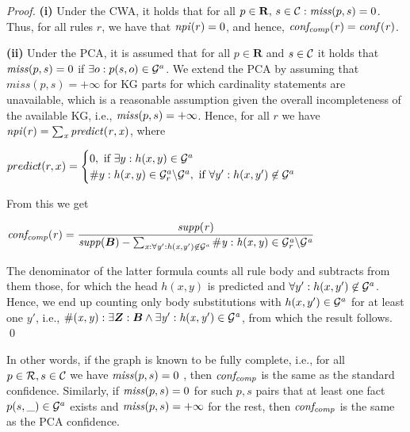\begin{proof}
\textbf{(i)} Under the CWA, it holds that for all $ p\in \mathbf{R},\,s\in \mathcal{C}: \mathit{miss}(p,s) = 0$. Thus, for all rules $r$, we have that $\mathit{npi}(r) = 0$, and hence, $\mathit{conf_{comp}(r)}=\mathit{conf(r)}$.
\smallskip

\noindent \textbf{(ii)} Under the PCA, it is assumed that for all $p\in \mathbf{R}$ and $s \in \mathcal{C}$ it holds that 
$\mathit{miss}(p,s) = 0$ if $\exists o: p(s,o)\in \mathcal{G}^a$. We extend the PCA by assuming that $miss(p,s)=+\infty$ for KG parts for which cardinality statements are unavailable, which is a reasonable assumption given the overall incompleteness of the available KG, i.e., 
$\mathit{miss}(p,s) = +\infty$. 
Hence, for all $r$ we have
$\mathit{npi(r)=\sum_{x}predict(r,x)}$, where

\begin{center}
$predict(r,x)=
\begin{cases}
0, \text{ if } \exists y: h(x,y)\in \mathcal{G}^a\\
\#y: h(x,y) \in \mathcal{G}^a_r\backslash \mathcal{G}^a, \text{ if } \forall y': h(x,y')\not\in \mathcal{G}^a\\
\end{cases}$
\end{center}
From this we get

\begin{center}
$\mi{conf_{comp}(r)=\dfrac{supp(r)}{supp(\vec{B})-\sum_{x: \forall y': h(x,y')\not\in\cG^a}\#y: h(x,y)\in \cG^a_r\backslash \cG^a}}$
\end{center}

The denominator of the latter formula counts all rule body and subtracts from them those, for which the head $h(x,y)$ is predicted and $\forall y':h(x,y')\not \in \mathcal{G}^a$. Hence, we end up counting only  body substitutions with $h(x,y')\in \mathcal{G}^a$ for at least  one $y'$, i.e., $\mi{\#(x,y):\exists \vec{Z}:\vec{B}\wedge \exists y': h(x,y')\in \cG^a}$, from which the result follows. \qed

\end{proof}



In other words, if %
the graph is known to be fully complete, i.e., for all $p \in\mathcal{R},s\in\mathcal{C}$ we have
$\mathit{miss}(p,s)=0$ , then $\mathit{conf_{comp}}$ is the same as the standard confidence. Similarly, if  $\mathit{miss}(p,s)= 0$ for such $p,s$ pairs that at least one 
fact $p(s,\_)\in \mathcal{G}^a$ exists and  $\mathit{miss}(p,s) = +\infty$ for the rest,  
then $\mathit{conf_{comp}}$ is the same as the PCA confidence.

